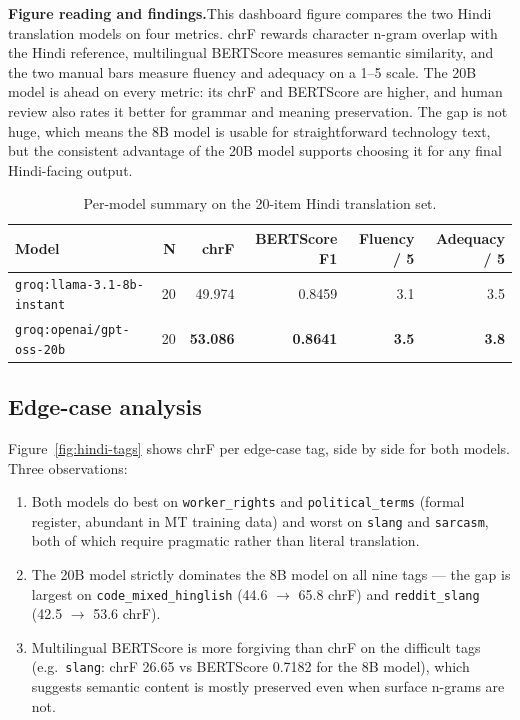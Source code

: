 \documentclass[11pt,a4paper]{article}
\newcommand{\figureexplanation}[1]{%
  \par\smallskip\noindent\textbf{Figure reading and findings.}\quad #1\par\medskip%
}
\begin{document}
\figureexplanation{This dashboard figure compares the two Hindi translation models on four
metrics. chrF rewards character n-gram overlap with the Hindi reference, multilingual BERTScore
measures semantic similarity, and the two manual bars measure fluency and adequacy on a 1--5 scale.
The 20B model is ahead on every metric: its chrF and BERTScore are higher, and human review also
rates it better for grammar and meaning preservation. The gap is not huge, which means the 8B model
is usable for straightforward technology text, but the consistent advantage of the 20B model
supports choosing it for any final Hindi-facing output.}

\begin{table}[H]
\centering
\small
\caption{Per-model summary on the 20-item Hindi translation set.}
\label{tab:hindi}
\renewcommand{\arraystretch}{1.15}
\begin{tabular}{l r r r r r}
\toprule
\textbf{Model} & \textbf{N} & \textbf{chrF} & \textbf{BERTScore F1} & \textbf{Fluency / 5} & \textbf{Adequacy / 5} \\
\midrule
\texttt{groq:llama-3.1-8b-instant}  & 20 & 49.974 & 0.8459 & 3.1 & 3.5 \\
\texttt{groq:openai/gpt-oss-20b}    & 20 & \textbf{53.086} & \textbf{0.8641} & \textbf{3.5} & \textbf{3.8} \\
\bottomrule
\end{tabular}
\end{table}

\subsection{Edge-case analysis}

Figure~\ref{fig:hindi-tags} shows chrF per edge-case tag, side by side for both models.
Three observations:

\begin{enumerate}
  \item Both models do best on \texttt{worker\_rights} and \texttt{political\_terms} (formal
        register, abundant in MT training data) and worst on \texttt{slang} and
        \texttt{sarcasm}, both of which require pragmatic rather than literal translation.
  \item The 20B model strictly dominates the 8B model on all nine tags --- the gap is largest on
        \texttt{code\_mixed\_hinglish} (44.6 $\rightarrow$ 65.8 chrF) and \texttt{reddit\_slang}
        (42.5 $\rightarrow$ 53.6 chrF).
  \item Multilingual BERTScore is more forgiving than chrF on the
        difficult tags (e.g.\ \texttt{slang}: chrF 26.65 vs BERTScore 0.7182 for the 8B model),
        which suggests semantic content is mostly preserved even when surface n-grams are not.
\end{enumerate}
\end{document}

